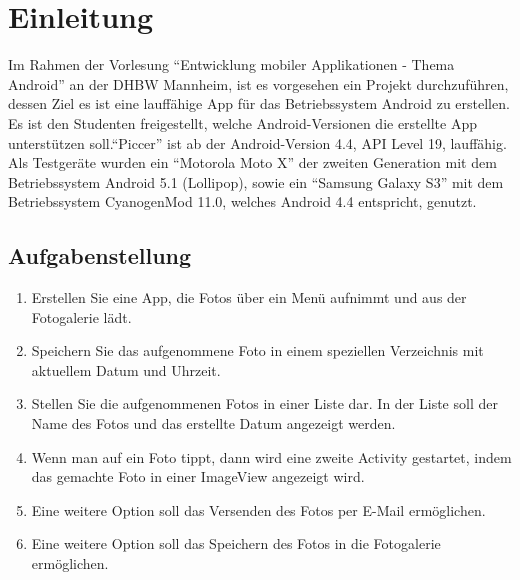 
\chapter{Einleitung}


Im Rahmen der Vorlesung \enquote{Entwicklung mobiler Applikationen - Thema Android} an der DHBW Mannheim, ist es vorgesehen ein Projekt durchzuführen, dessen Ziel es ist eine lauffähige App für das Betriebssystem Android zu erstellen.
\\Es ist den Studenten freigestellt, welche Android-Versionen die erstellte App unterstützen soll.\enquote{Piccer} ist ab der Android-Version 4.4, API Level 19, lauffähig.
\\Als Testgeräte wurden ein \enquote{Motorola Moto X} der zweiten Generation mit dem Betriebssystem Android 5.1 (Lollipop), sowie ein \enquote{Samsung Galaxy S3} mit dem Betriebssystem CyanogenMod 11.0, welches Android 4.4 entspricht, genutzt.


\section{Aufgabenstellung}
\begin{enumerate}
\item Erstellen Sie eine App, die Fotos über ein Menü aufnimmt und aus der Fotogalerie lädt.
\item Speichern Sie das aufgenommene Foto in einem speziellen Verzeichnis mit aktuellem Datum und Uhrzeit.
\item Stellen Sie die aufgenommenen Fotos in einer Liste dar. In der Liste soll der Name des Fotos und das erstellte Datum angezeigt werden.
\item Wenn man auf ein Foto tippt, dann wird eine zweite Activity gestartet, indem das gemachte Foto in einer ImageView angezeigt wird.
\item Eine weitere Option soll das Versenden des Fotos per E-Mail ermöglichen.
\item Eine weitere Option soll das Speichern des Fotos in die Fotogalerie ermöglichen.
\end{enumerate}

